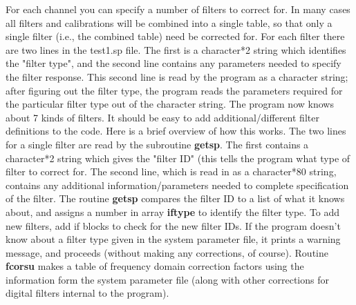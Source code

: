 For each channel you can specify a number of filters
to correct for.  
In many cases all filters and calibrations will be combined
into a single table, so that only a single filter (i.e.,
the combined table) need be corrected for.
For each filter there are two lines
in the test1.sp file.  The first is a character*2
string which identifies the "filter type", and
the second line contains any parameters needed to specify the
filter response.
This second line is read by the program as a character string;
after figuring out the filter type, the program reads
the parameters required for the particular filter type
out of the character string.
The program now knows about 7 kinds of filters.
It should be easy to add additional/different filter
definitions to the code.
Here is a brief overview of how this works.
The two lines for a single filter
are read by the subroutine {\bf getsp}.
The first contains a character*2 string which
gives the "filter ID" (this tells the program what
type of filter to correct for.
The second line,
which is read in as a character*80 string,
contains any additional information/parameters needed
to complete specification of the filter.
The routine {\bf getsp} compares the filter ID to a list of what
it knows about,
and assigns a number in array {\bf iftype}
to identify the filter type.
To add new filters, add if blocks to check for
the new filter IDs.
If the program doesn't know about a filter type
given in the system parameter file, it prints a warning message,
and proceeds (without making any corrections, of course).
Routine {\bf fcorsu} makes a table of frequency domain
correction factors using the information form the system parameter file
(along with other corrections for digital filters internal to
the program).

